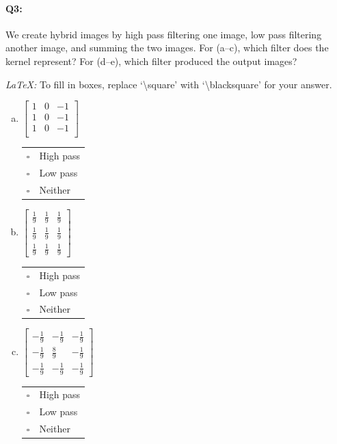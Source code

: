 \pagebreak
\paragraph{Q3:} We create hybrid images by high pass filtering one image, low pass filtering another image, and summing the two images. For (a--c), which filter does the kernel represent? For (d--e), which filter produced the output images?

\emph{LaTeX:} To fill in boxes, replace `\textbackslash square' with `\textbackslash blacksquare' for your answer.

\begin{enumerate}[(a)]
\item
 $\begin{bmatrix}
    1 & 0 & -1 \\
    1 & 0 & -1 \\
    1 & 0 & -1 \\
 \end{bmatrix}$
\begin{tabular}[h]{ll}
$\square$ & High pass \\
$\square$ & Low pass \\
$\square$ & Neither \\
\end{tabular}

\item
 $\begin{bmatrix}
    \frac{1}{9} & \frac{1}{9} & \frac{1}{9} \\
    \frac{1}{9} & \frac{1}{9} & \frac{1}{9} \\
    \frac{1}{9} & \frac{1}{9} & \frac{1}{9}
 \end{bmatrix}$
\begin{tabular}[h]{ll}
$\square$ & High pass \\
$\square$ & Low pass \\
$\square$ & Neither \\
\end{tabular}

\item
$\begin{bmatrix}
    -\frac{1}{9} & -\frac{1}{9} & -\frac{1}{9} \\
    -\frac{1}{9} & \frac{8}{9} & -\frac{1}{9} \\
    -\frac{1}{9} & -\frac{1}{9} & -\frac{1}{9}
  \end{bmatrix}$
\begin{tabular}[h]{ll}
$\square$ & High pass \\
$\square$ & Low pass \\
$\square$ & Neither \\
\end{tabular}


\end{enumerate}
